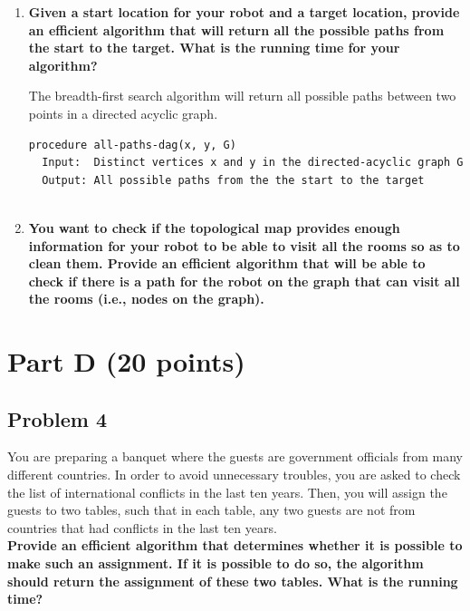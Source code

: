 \documentclass[11pt]{article}
\begin{document}
\begin{enumerate}[label=\Alph*.]

\item \textbf{Given a start location for your robot and a target
location, provide an efficient algorithm that will return all the
possible paths from the start to the target.  What is the running time
for your algorithm?}

The breadth-first search algorithm will return all possible paths
between two points in a directed acyclic graph.

\begin{verbatim}
procedure all-paths-dag(x, y, G)
  Input:  Distinct vertices x and y in the directed-acyclic graph G
  Output: All possible paths from the the start to the target
  
\end{verbatim}

\item \textbf{You want to check if the topological map provides
enough information for your robot to be able to visit all the rooms so
as to clean them. Provide an efficient algorithm that will be able to
check if there is a path for the robot on the graph that can visit all
the rooms (i.e., nodes on the graph).}
\end{enumerate}

\section*{Part D (20 points)}

\subsection*{Problem 4} You are preparing a banquet where the
guests are government officials from many different countries. In
order to avoid unnecessary troubles, you are asked to check the list
of international conflicts in the last ten years. Then, you will
assign the guests to two tables, such that in each table, any two
guests are not from countries that had conflicts in the last ten
years.\\

\noindent \textbf{Provide an efficient algorithm that determines whether it is
possible to make such an assignment. If it is possible to do so, the
algorithm should return the assignment of these two tables. What is
the running time?}
\end{document}
